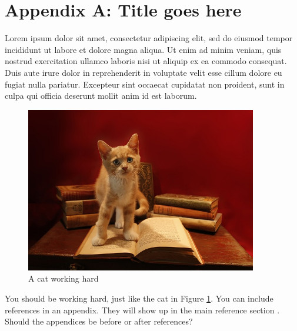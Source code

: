 \appendix

\renewcommand{\thesection}{A.\arabic{section}}
\renewcommand{\thefigure}{A.\arabic{figure}}
\renewcommand{\thetable}{A.\arabic{table}}
\renewcommand{\theequation}{A.\arabic{equation}}

\setcounter{figure}{0}
\setcounter{table}{0}
\setcounter{equation}{0}


\section*{Appendix A: Title goes here}
\label{appendix:A}

Lorem ipsum dolor sit amet, consectetur adipiscing elit, sed do eiusmod tempor incididunt ut labore et dolore magna aliqua. Ut enim ad minim veniam, quis nostrud exercitation ullamco laboris nisi ut aliquip ex ea commodo consequat. Duis aute irure dolor in reprehenderit in voluptate velit esse cillum dolore eu fugiat nulla pariatur. Excepteur sint occaecat cupidatat non proident, sunt in culpa qui officia deserunt mollit anim id est laborum.

\begin{figure}[h]
\includegraphics[width=0.9\textwidth]{Images/cat2.jpg}
\centering
\caption{A cat working hard}
\label{figure:A.1}
\end{figure}

You should be working hard, just like the cat in Figure \ref{figure:A.1}. You can include references in an appendix. They will show up in the main reference section \cite{Reference3}. Should the appendices be before or after references?
